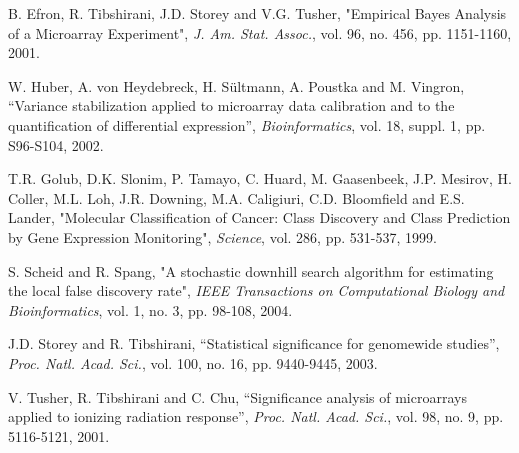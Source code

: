 \documentclass[11pt,a4paper,fleqn]{report}
\begin{document}
       
\begin{thebibliography}{1}

B. Efron, R. Tibshirani, J.D. Storey and V.G. Tusher, "Empirical Bayes Analysis of a Microarray Experiment", \emph{J. Am. Stat. Assoc.}, vol. 96, no. 456, pp. 1151-1160, 2001.

W. Huber, A. von Heydebreck, H. S{\"u}ltmann, A. Poustka and M. Vingron, ``Variance stabilization applied to microarray data calibration and to the quantification of differential expression'', \emph{Bioinformatics}, vol. 18, suppl. 1, pp. S96-S104, 2002.

T.R. Golub, D.K. Slonim, P. Tamayo, C. Huard, M. Gaasenbeek, J.P. Mesirov, H. Coller, M.L. Loh, J.R. Downing, M.A. Caligiuri, C.D. Bloomfield and E.S. Lander, "Molecular Classification of Cancer: Class Discovery and Class Prediction by Gene Expression Monitoring", \emph{Science}, vol. 286, pp. 531-537, 1999.

S. Scheid and R. Spang, "A stochastic downhill search algorithm for estimating the local false discovery rate", \emph{IEEE Transactions on Computational Biology and Bioinformatics}, vol. 1, no. 3, pp. 98-108, 2004.

J.D. Storey and R. Tibshirani, ``Statistical significance for genomewide studies'', \textit{Proc. Natl. Acad. Sci.}, vol. 100, no. 16, pp. 9440-9445, 2003.

V. Tusher, R. Tibshirani and C. Chu, ``Significance analysis of microarrays applied to ionizing radiation response'', \textit{Proc. Natl. Acad. Sci.}, vol. 98, no. 9, pp. 5116-5121, 2001.

\end{thebibliography}
\end{document}
